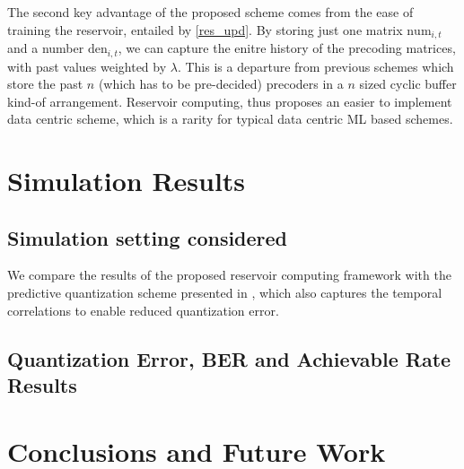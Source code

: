 \documentclass[conference]{IEEEtran}
\begin{document}
The second key advantage of the proposed scheme comes from the ease of training the reservoir, entailed by \eqref{res_upd}.
By storing just one matrix $\text{num}_{i,t}$ and a number $\text{den}_{i,t}$, we can capture the enitre history of the precoding matrices, with past values weighted by $\lambda$.
This is a departure from previous schemes \cite{Gupt1905:Predictive,6891198,6545375} which store the past $n$ (which has to be pre-decided) precoders in a $n$ sized cyclic buffer kind-of arrangement.
Reservoir computing, thus proposes an easier to implement data centric scheme, which is a rarity for typical data centric ML based schemes.


\section{Simulation Results}
\label{section4}
\subsection{Simulation setting considered}
\label{setting}
\noindent We compare the results of the proposed reservoir computing framework with the predictive quantization scheme presented in \cite{6891198}, which also captures the temporal correlations to enable reduced quantization error.
\subsection{Quantization Error, BER and Achievable Rate Results}
\label{res}
\section{Conclusions and Future Work}
\label{section5}




\renewcommand{\bibfont}{\footnotesize}


\end{document}
